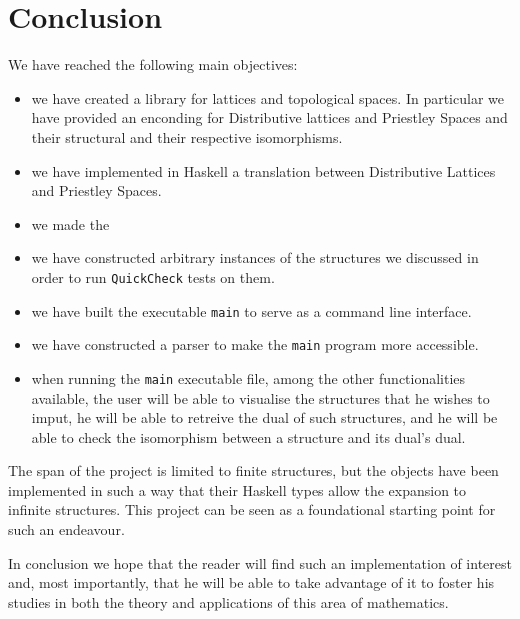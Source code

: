 
\section{Conclusion}\label{sec:Conclusion}

We have reached the following main objectives:

\begin{itemize}


    \item we have created a library for lattices and topological spaces. In particular we have provided an enconding for Distributive lattices and Priestley Spaces and their structural and their respective isomorphisms.  
    \item we have implemented in Haskell a translation between Distributive Lattices and Priestley Spaces. 
    \item we made the 
    \item we have constructed arbitrary instances of the structures we discussed in order to run \texttt{QuickCheck} tests on them.
    \item we have built the executable \texttt{main} to serve as a command line interface.  
    \item we have constructed a parser to make the \texttt{main} program more accessible.   
    \item when running the \texttt{main} executable file, among the other functionalities available, the user will be able to visualise the structures that he wishes to imput, he will be able to retreive the dual of such structures, and he will be able to check the isomorphism between a structure and its dual's dual. 
\end{itemize}

The span of the project is limited to finite structures, but the objects have been implemented in such a way that their Haskell types allow the expansion to infinite structures. This project can be seen as a foundational starting point for such an endeavour. 

In conclusion we hope that the reader will find such an implementation of interest and, most importantly, that he will be able to take advantage of it to foster his studies in both the theory and applications of this area of mathematics. 